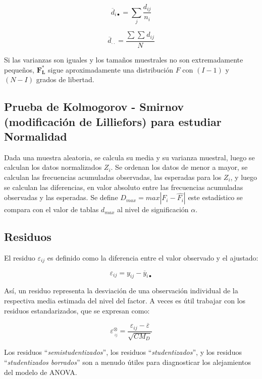 \documentclass[]{book}
\theoremstyle{definition}
\theoremstyle{definition}
\theoremstyle{definition}
\theoremstyle{remark}
\begin{document}
\[
\overline{d}_{i\bullet} = \sum_{j}^{}\frac{d_{ij}}{n_{i}}
\]

\[
\overline{d}_{\cdot \cdot } = \frac{\sum_{}^{}{\sum_{}^{}{d_{ij}}}}{N}
\]

Si las varianzas son iguales y los tamaños muestrales no son
extremadamente pequeños, \(\mathbf{F}_{\mathbf{L}}^{\mathbf{*}}\) sigue
aproximadamente una distribución \(F\) con \((I - 1)\) y \((N - I)\)
grados de libertad.

\hypertarget{prueba-de-kolmogorov---smirnov-modificacion-de-lilliefors-para-estudiar-normalidad}{%
\subsection{Prueba de Kolmogorov - Smirnov (modificación de Lilliefors)
para estudiar
Normalidad}\label{prueba-de-kolmogorov---smirnov-modificacion-de-lilliefors-para-estudiar-normalidad}}

Dada una muestra aleatoria, se calcula su media y su varianza muestral,
luego se calculan los datos normalizados \(Z_{i}\). Se ordenan los datos
de menor a mayor, se calculan las frecuencias acumuladas observadas, las
esperadas para los \(Z_{i}\), y luego se calculan las diferencias, en
valor absoluto entre las frecuencias acumuladas observadas y las
esperadas. Se define \(D_{max} = max\left| F_{i} - \hat{F_{i}} \right|\)
este estadístico se compara con el valor de tablas \(d_{max}\) al nivel
de significación \(\alpha\).

\hypertarget{residuos}{%
\subsection{Residuos}\label{residuos}}

El residuo \(\varepsilon_{ij}\) es definido como la diferencia entre el
valor observado y el ajustado:

\[
\varepsilon_{ij} = y_{ij} - \overline{y}_{i\bullet}
\]

Así, un residuo representa la desviación de una observación individual
de la respectiva media estimada del nivel del factor. A veces es útil
trabajar con los residuos estandarizados, que se expresan como:

\[
\varepsilon_{\ _{ij}}^{\otimes} = \frac{\varepsilon_{ij} - \overline{\varepsilon}}{\sqrt{CM_D}}
\]

Los residuos ``\emph{semistudentizados}'', los residuos
``\emph{studentizados}'', y los residuos ``\emph{studentizados
borrados}'' son a menudo útiles para diagnosticar los alejamientos del
modelo de ANOVA.
\end{document}
